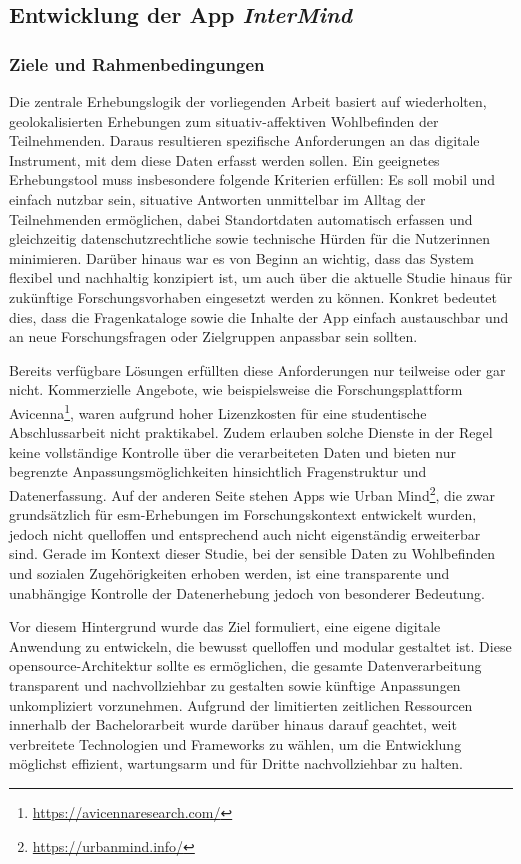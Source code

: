 \subsection{Entwicklung der App \textit{InterMind}}

\subsubsection{Ziele und Rahmenbedingungen}

Die zentrale Erhebungslogik der vorliegenden Arbeit basiert auf wiederholten, geolokalisierten Erhebungen zum situativ-affektiven Wohlbefinden der Teilnehmenden. Daraus resultieren spezifische Anforderungen an das digitale Instrument, mit dem diese Daten erfasst werden sollen. Ein geeignetes Erhebungstool muss insbesondere folgende Kriterien erfüllen: Es soll mobil und einfach nutzbar sein, situative Antworten unmittelbar im Alltag der Teilnehmenden ermöglichen, dabei Standortdaten automatisch erfassen und gleichzeitig datenschutzrechtliche sowie technische Hürden für die Nutzer\genderstern innen minimieren. Darüber hinaus war es von Beginn an wichtig, dass das System flexibel und nachhaltig konzipiert ist, um auch über die aktuelle Studie hinaus für zukünftige Forschungsvorhaben eingesetzt werden zu können. Konkret bedeutet dies, dass die Fragenkataloge sowie die Inhalte der App einfach austauschbar und an neue Forschungsfragen oder Zielgruppen anpassbar sein sollten.

Bereits verfügbare Lösungen erfüllten diese Anforderungen nur teilweise oder gar nicht. Kommerzielle Angebote, wie beispielsweise die Forschungsplattform Avicenna\footnote{\href{https://avicennaresearch.com/}{https://avicennaresearch.com/}}, waren aufgrund hoher Lizenzkosten für eine studentische Abschlussarbeit nicht praktikabel. Zudem erlauben solche Dienste in der Regel keine vollständige Kontrolle über die verarbeiteten Daten und bieten nur begrenzte Anpassungsmöglichkeiten hinsichtlich Fragenstruktur und Datenerfassung. Auf der anderen Seite stehen Apps wie Urban Mind\footnote{\href{https://urbanmind.info/}{https://urbanmind.info/}}, die zwar grundsätzlich für \gls{esm}-Erhebungen im Forschungskontext entwickelt wurden, jedoch nicht quelloffen und entsprechend auch nicht eigenständig erweiterbar sind. Gerade im Kontext dieser Studie, bei der sensible Daten zu Wohlbefinden und sozialen Zugehörigkeiten erhoben werden, ist eine transparente und unabhängige Kontrolle der Datenerhebung jedoch von besonderer Bedeutung.

Vor diesem Hintergrund wurde das Ziel formuliert, eine eigene digitale Anwendung zu entwickeln, die bewusst quelloffen und modular gestaltet ist. Diese \gls{opensource}-Architektur sollte es ermöglichen, die gesamte Datenverarbeitung transparent und nachvollziehbar zu gestalten sowie künftige Anpassungen unkompliziert vorzunehmen. Aufgrund der limitierten zeitlichen Ressourcen innerhalb der Bachelorarbeit wurde darüber hinaus darauf geachtet, weit verbreitete Technologien und Frameworks zu wählen, um die Entwicklung möglichst effizient, wartungsarm und für Dritte nachvollziehbar zu halten.

